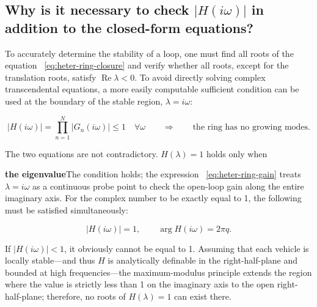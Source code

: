 \documentclass[11pt,a4paper,openany]{book}
\numberwithin{equation}{chapter}
\numberwithin{figure}{chapter}
\numberwithin{table}{chapter}
\begin{document}
\subsection{Why is it necessary to check $|H(i\omega)|$ in addition to the closed-form equations?}










To accurately determine the stability of a loop, one must find all roots of the equation ~\eqref{eq:heter-ring-closure} and verify whether all roots, except for the translation roots, satisfy $\operatorname{Re}\lambda<0$. To avoid directly solving complex transcendental equations, a more easily computable sufficient condition can be used at the boundary of the stable region, $\lambda=i\omega$:










\begin{tcolorbox}[keybox,title=\textbf{Sufficient Condition for the Modulus of the Loop}]
\begin{equation}
\left|H(i\omega)\right|
=\prod_{n=1}^{N}\left|G_n(i\omega)\right| \le 1
\quad \forall\omega
\qquad\Longrightarrow\qquad \text{the ring has no growing modes}.
\label{eq:heter-ring-gain}
\end{equation}
\end{tcolorbox}










The two equations are not contradictory. $H(\lambda)=1$ holds only when




\textbf{the eigenvalue}The condition holds; the expression ~\eqref{eq:heter-ring-gain} treats $\lambda=i\omega$ as a continuous probe point to check the open-loop gain along the entire imaginary axis. For the complex number to be exactly equal to 1, the following must be satisfied simultaneously:

\[
|H(i\omega)|=1,
\qquad
\arg H(i\omega)=2\pi q.
\]

If $|H(i\omega)|<1$, it obviously cannot be equal to 1. Assuming that each vehicle is locally stable—and thus $H$ is analytically definable in the right-half-plane and bounded at high frequencies—the maximum-modulus principle extends the region where the value is strictly less than 1 on the imaginary axis to the open right-half-plane; therefore, no roots of $H(\lambda)=1$ can exist there.
\end{document}
